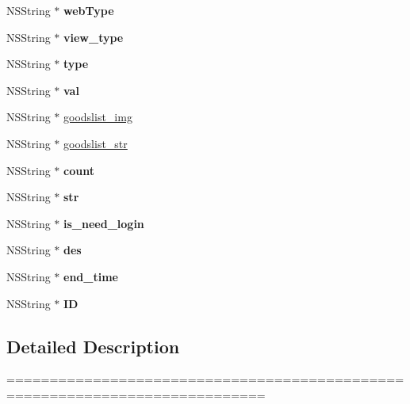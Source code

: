 \begin{DoxyCompactItemize}
N\+S\+String $\ast$ {\bfseries web\+Type}
\item 
\mbox{\label{interface_menu_model_ab2f2e2cd474d488917f093d47d240b91}} 
N\+S\+String $\ast$ {\bfseries view\+\_\+type}
\item 
\mbox{\label{interface_menu_model_a9a8756d6c1e63ee45da3beda9c6821f3}} 
N\+S\+String $\ast$ {\bfseries type}
\item 
\mbox{\label{interface_menu_model_a44310777473d037ee75fe79850cc4bce}} 
N\+S\+String $\ast$ {\bfseries val}
\item 
N\+S\+String $\ast$ \mbox{\hyperlink{interface_menu_model_af74962677558dc68fb50b877611413a4}{goodslist\+\_\+img}}
\item 
N\+S\+String $\ast$ \mbox{\hyperlink{interface_menu_model_a8f06ea6914aa40ad5e7e310aac14ce26}{goodslist\+\_\+str}}
\item 
\mbox{\label{interface_menu_model_a27ab96b3f9475b9bbaa1a399467a4696}} 
N\+S\+String $\ast$ {\bfseries count}
\item 
\mbox{\label{interface_menu_model_ab4319b715aff148f77bb4decac1b8fd9}} 
N\+S\+String $\ast$ {\bfseries str}
\item 
\mbox{\label{interface_menu_model_a2e502f66eefa8b78eaf1967eeb0cea70}} 
N\+S\+String $\ast$ {\bfseries is\+\_\+need\+\_\+login}
\item 
\mbox{\label{interface_menu_model_a51779733c594d23098be64238c1d4ba6}} 
N\+S\+String $\ast$ {\bfseries des}
\item 
\mbox{\label{interface_menu_model_a0380d196bd43e6881a06f7f03e0d0a89}} 
N\+S\+String $\ast$ {\bfseries end\+\_\+time}
\item 
\mbox{\label{interface_menu_model_a8d521771d5cf418b71c738c18681ddcd}} 
N\+S\+String $\ast$ {\bfseries ID}
\end{DoxyCompactItemize}


\subsection{Detailed Description}
============================================================================

